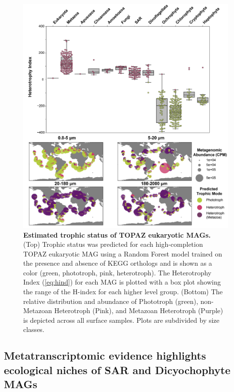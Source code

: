 \documentclass[12pt]{article}
\numberwithin{equation}{section}
\begin{document}
\begin{figure}[h!]    
    \centering
    \includegraphics[width = 0.9\columnwidth]{figures/Figure4_Trophic_Mode_v2-01.png}
    \caption{\textbf{Estimated trophic status of TOPAZ eukaryotic MAGs.} (Top) Trophic status was predicted for each high-completion TOPAZ eukaryotic MAG using a Random Forest model trained on the presence and absence of KEGG orthologs and is shown as a color (green, phototroph, pink, heterotroph). The Heterotrophy Index (\cref{eq:hind})  for each MAG is plotted with a box plot showing the range of the H-index for each higher level group. (Bottom) The relative distribution and abundance of Phototroph (green), non-Metazoan Heterotroph (Pink), and Metazoan Heterotroph (Purple) is depicted across all surface samples. Plots are subdivided by size classes. }
    \label{fig:fig4-trophy}
\end{figure}

\subsection*{Metatranscriptomic evidence highlights ecological niches of SAR and Dicyochophyte MAGs}
\end{document}
